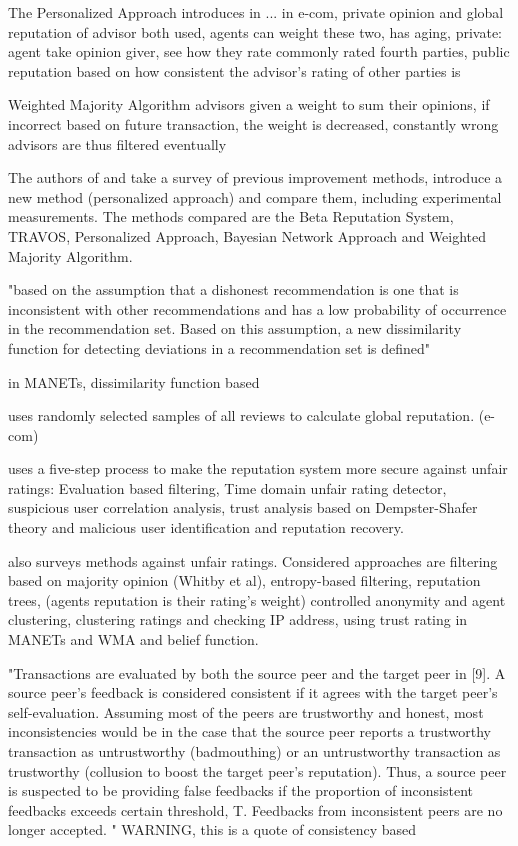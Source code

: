 \documentclass[%
    ]{\PathToTumTemplate/thesis/tum_thesis}
\begin{document}
The Personalized Approach introduces in \cite{zhang_personalized_2006} ...
in e-com, private opinion and global reputation of advisor both used, agents can weight these two, has aging, private: agent take opinion giver, see how they rate commonly rated fourth parties, public reputation based on how consistent the advisor's rating of other parties is

\cite{yu_detecting_2003} Weighted Majority Algorithm 
advisors given a weight to sum their opinions, if incorrect based on future transaction, the weight is decreased, constantly wrong advisors are thus filtered eventually

The authors of \cite{zhang_personalized_2006} and \cite{zhang_detailed_2008} take a survey of previous improvement methods, introduce a new method (personalized approach) and compare them, including experimental measurements. The methods compared are the Beta Reputation System, TRAVOS, Personalized Approach, Bayesian Network Approach and Weighted Majority Algorithm. 

\cite{iltaf_mechanism_2013}
"based on the assumption that a dishonest recommendation is one that is inconsistent with other recommendations and has a low probability of occurrence in the recommendation set. Based on this assumption, a new dissimilarity function for detecting deviations in a recommendation set is defined"

\cite{zakirullah_detection_2014} in MANETs, dissimilarity function based

\cite{rezvani_randomized_2020} uses randomly selected samples of all reviews to calculate global reputation. (e-com)

\cite{baby_secure_2014} uses a five-step process to make the reputation system more secure against unfair ratings:
Evaluation based filtering, 
Time domain unfair rating detector, 
suspicious user correlation analysis, 
trust analysis based on Dempster-Shafer theory and 
malicious user identification and reputation recovery.

\cite{ngo_survey_2007} also surveys methods against unfair ratings. Considered approaches are
filtering based on majority opinion (Whitby et al), 
entropy-based filtering, 
reputation trees, (agents reputation is their rating's weight)
controlled anonymity and agent clustering,
clustering ratings and checking IP address, 
using trust rating in MANETs and 
WMA and belief function.

\cite{azzedin_identifying_2010}

"Transactions are evaluated by both the source peer and the target peer in [9]. A source peer's feedback is considered
consistent if it agrees with the target peer's self-evaluation. Assuming most of the peers are trustworthy and honest,
most inconsistencies would be in the case that the source peer reports a trustworthy transaction as untrustworthy
(badmouthing) or an untrustworthy transaction as trustworthy (collusion to boost the target peer's reputation). Thus,
a source peer is suspected to be providing false feedbacks if the proportion of inconsistent feedbacks exceeds certain
threshold, T. Feedbacks from inconsistent peers are no longer accepted.
" WARNING, this is a quote of consistency based
\end{document}
